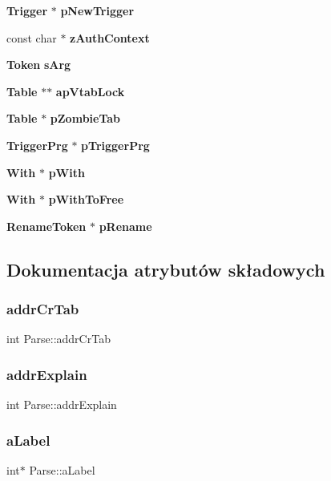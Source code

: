 \begin{DoxyCompactItemize}
\item 
\textbf{ Trigger} $\ast$ \textbf{ p\+New\+Trigger}
\item 
const char $\ast$ \textbf{ z\+Auth\+Context}
\item 
\textbf{ Token} \textbf{ s\+Arg}
\item 
\textbf{ Table} $\ast$$\ast$ \textbf{ ap\+Vtab\+Lock}
\item 
\textbf{ Table} $\ast$ \textbf{ p\+Zombie\+Tab}
\item 
\textbf{ Trigger\+Prg} $\ast$ \textbf{ p\+Trigger\+Prg}
\item 
\textbf{ With} $\ast$ \textbf{ p\+With}
\item 
\textbf{ With} $\ast$ \textbf{ p\+With\+To\+Free}
\item 
\textbf{ Rename\+Token} $\ast$ \textbf{ p\+Rename}
\end{DoxyCompactItemize}


\subsection{Dokumentacja atrybutów składowych}
\mbox{\label{struct_parse_a4ca16d26d451cd965dbb81906f9c6b0e}} 
\subsubsection{addrCrTab}
{\footnotesize\ttfamily int Parse\+::addr\+Cr\+Tab}

\mbox{\label{struct_parse_a24c2b30303fafcdd561cb4ecaa4b6dbd}} 
\subsubsection{addrExplain}
{\footnotesize\ttfamily int Parse\+::addr\+Explain}

\mbox{\label{struct_parse_a67e861822e4cec97b0e45ec16fac3250}} 
\subsubsection{aLabel}
{\footnotesize\ttfamily int$\ast$ Parse\+::a\+Label}

\mbox{\label{struct_parse_acdfd318c0f04ec640d6affc85ef8a009}} 
